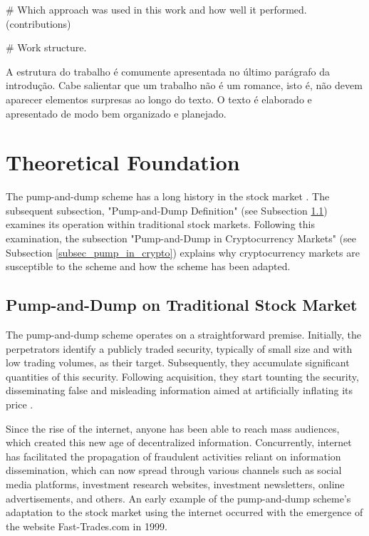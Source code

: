 \documentclass[12pt]{article}
\begin{document}
	

	\# Which approach was used in this work and how well it performed. (contributions)

	\# Work structure.
	
	A estrutura do trabalho é comumente apresentada no último parágrafo da introdução. Cabe salientar que um trabalho não é um romance, isto é, não devem aparecer elementos surpresas ao longo do texto. O texto é elaborado e apresentado de modo bem organizado e planejado. 
	
	\section{Theoretical Foundation}
	\label{sec_fund_teorica}

	The pump-and-dump scheme has a long history in the stock market \citep{lamorgia2020}.
	The subsequent subsection, "Pump-and-Dump Definition" (see Subsection \ref{subsec_pump_def}) examines its operation within traditional stock markets.
	Following this examination, the subsection "Pump-and-Dump in Cryptocurrency Markets" (see Subsection \ref{subsec_pump_in_crypto}) explains why cryptocurrency markets are susceptible to the scheme and how the scheme has been adapted.

	\subsection{Pump-and-Dump on Traditional Stock Market}
	\label{subsec_pump_def}

	The pump-and-dump scheme operates on a straightforward premise.
	Initially, the perpetrators identify a publicly traded security, typically of small size and with low trading volumes, as their target.
	Subsequently, they accumulate significant quantities of this security.
	Following acquisition, they start tounting the security, disseminating false and misleading information aimed at artificially inflating its price \citep{kramer2005}.

	Since the rise of the internet, anyone has been able to reach mass audiences, which created this new age of decentralized information.
	Concurrently, internet has facilitated the propagation of fraudulent activities reliant on information dissemination, which can now spread through various channels such as social media platforms, investment research websites, investment newsletters, online advertisements, and others.
	An early example of the pump-and-dump scheme's adaptation to the stock market using the internet occurred with the emergence of the website Fast-Trades.com in 1999.
\end{document}
